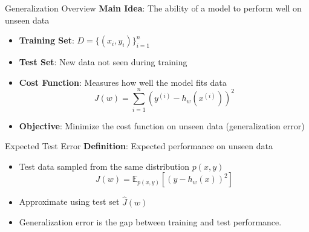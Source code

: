 \documentclass[serif, aspectratio=169]{beamer}
\begin{document}





    \begin{frame}{Generalization Overview}
        \textbf{Main Idea}: The ability of a model to perform well on unseen data
        \begin{itemize}
            \item \textbf{Training Set}: \( D = \{(x_i, y_i)\}_{i=1}^n \)
            \item \textbf{Test Set}: New data not seen during training
            \item \textbf{Cost Function}: Measures how well the model fits data
            \[
                J(w) = \sum_{i=1}^{n} (y^{(i)} - h_w(x^{(i)}))^2
            \]
            \item \textbf{Objective}: Minimize the cost function on unseen data (generalization error)
        \end{itemize}
    \end{frame}

    \begin{frame}{Expected Test Error}
        \textbf{Definition}: Expected performance on unseen data
        \begin{itemize}
            \item Test data sampled from the same distribution \( p(x, y) \)
            \[
                J(w) = \mathbb{E}_{p(x,y)}[(y - h_w(x))^2]
            \]
            \item Approximate using test set \( \hat{J}(w) \)
            \item Generalization error is the gap between training and test performance.
        \end{itemize}
    \end{frame}
\end{document}
